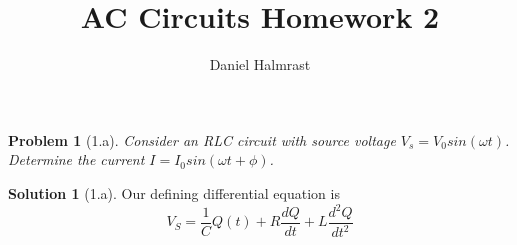 \documentclass[12pt]{article}
\newtheorem{problem}{Problem}
\theoremstyle{definition}
\newtheorem{solution}{Solution}
\begin{document}
\title{AC Circuits Homework 2}
\author{Daniel Halmrast}
\maketitle

\begin{problem}[1.a]
Consider an RLC circuit with source voltage $V_s = V_0 sin(\omega t)$.
Determine the current $I = I_0 sin(\omega t + \phi)$.
\end{problem}

\begin{solution}[1.a]
Our defining differential equation is
\[
	V_S = \frac{1}{C}Q(t) + R\frac{dQ}{dt} + L\frac{d^2Q}{dt^2}
\]
\end{solution}
\end{document}
